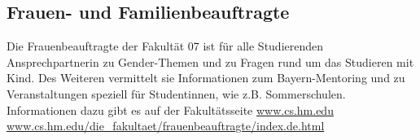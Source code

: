 \subsection{Frauen- und Familienbeauftragte}
Die Frauenbeauftragte der Fakultät 07 ist für alle Studierenden 
Ansprechpartnerin zu Gender-Themen und zu Fragen rund um das 
Studieren mit Kind. Des Weiteren vermittelt sie Informationen zum 
Bayern-Mentoring und zu Veranstaltungen speziell für Studentinnen, 
wie z.B. Sommerschulen. Informationen dazu gibt es auf der 
Fakultätsseite\doublebreak
\url{www.cs.hm.edu} \arrow {} \arrow {} \arrow {}\doublebreak
\url{www.cs.hm.edu/die_fakultaet/frauenbeauftragte/index.de.html}